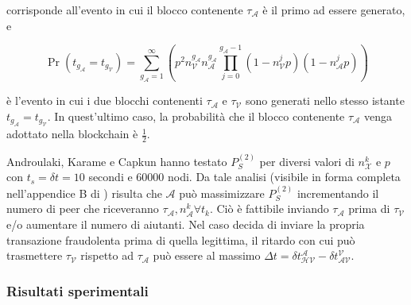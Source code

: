corrisponde all'evento in cui il blocco contenente $\tau_\mathcal{A}$ è il primo ad essere generato, e

\[ \Pr \left( t_{g_\mathcal{A}} = t_{g_\mathcal{V}} \right) = \sum^{\infty}_{g_\mathcal{A}=1} \left( p^2 n^{g_\mathcal{A}}_\mathcal{V} n^{g_\mathcal{A}}_\mathcal{A} \prod^{g_\mathcal{A} - 1}_{j=0} \left( 1 - n^j_\mathcal{V} p \right)\left( 1 - n^j_\mathcal{A} p \right) \right) \]

è l'evento in cui i due blocchi contenenti $\tau_\mathcal{A}$ e $\tau_\mathcal{V}$ sono generati nello stesso istante $t_{g_\mathcal{A}} = t_{g_\mathcal{V}}$. In quest'ultimo caso, la probabilità che il blocco contenente $\tau_\mathcal{A}$ venga adottato nella blockchain è $\frac{1}{2}$.

Androulaki, Karame e Capkun hanno testato $P^{\left(2\right)}_S$ per diversi valori di $n^k_\mathcal{X}$ e $p$ con $t_s = \delta t = 10$ secondi e 60000 nodi. Da tale analisi (visibile in forma completa nell'appendice B di \cite{doublespendig_fast}) risulta che $\mathcal{A}$ può massimizzare $P^{\left(2\right)}_S$ incrementando il numero di peer che riceveranno $\tau_\mathcal{A}, n^k_\mathcal{A} \forall t_k$. Ciò è fattibile inviando $\tau_\mathcal{A}$ prima di $\tau_\mathcal{V}$ e/o aumentare il numero di aiutanti. Nel caso decida di inviare la propria transazione fraudolenta prima di quella legittima, il ritardo con cui può trasmettere $\tau_\mathcal{V}$ rispetto ad $\tau_\mathcal{A}$ può essere al massimo $\Delta t = \delta t^\mathcal{A}_\mathcal{HV} - \delta t^\mathcal{V}_\mathcal{AV}$.

\subsubsection{Risultati sperimentali}

